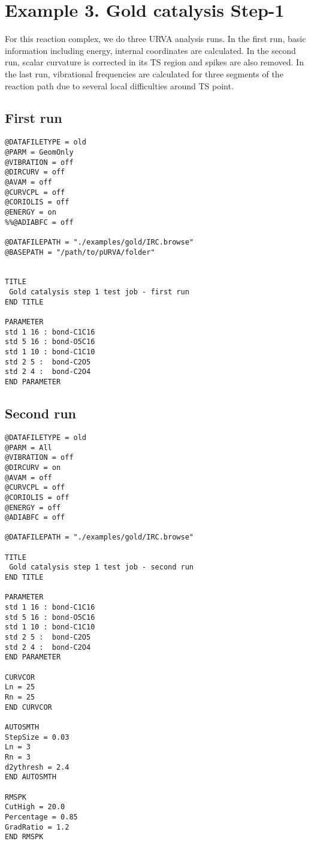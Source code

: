 \section{Example 3. Gold catalysis Step-1}
For this reaction complex, we do three URVA analysis runs. In the first run, basic information including energy, internal coordinates are calculated. In the second run, scalar curvature is corrected in its TS region and spikes are also removed. In the last run, vibrational frequencies are calculated for three segments of the reaction path due to several local difficulties around TS point.




\subsection{First run}

\begin{tcolorbox}

\begingroup\singlespacing
\begin{verbatim}
@DATAFILETYPE = old   
@PARM = GeomOnly 
@VIBRATION = off
@DIRCURV = off  
@AVAM = off  
@CURVCPL = off  
@CORIOLIS = off  
@ENERGY = on
%%@ADIABFC = off

@DATAFILEPATH = "./examples/gold/IRC.browse"
@BASEPATH = "/path/to/pURVA/folder"


TITLE
 Gold catalysis step 1 test job - first run
END TITLE

PARAMETER
std 1 16 : bond-C1C16
std 5 16 : bond-O5C16
std 1 10 : bond-C1C10
std 2 5 :  bond-C2O5
std 2 4 :  bond-C2O4
END PARAMETER

\end{verbatim}
\endgroup

\end{tcolorbox}


\subsection{Second run}

\begin{tcolorbox}

\begingroup\singlespacing
\begin{verbatim}
@DATAFILETYPE = old   
@PARM = All 
@VIBRATION = off
@DIRCURV = on
@AVAM = off  
@CURVCPL = off  
@CORIOLIS = off  
@ENERGY = off
@ADIABFC = off

@DATAFILEPATH = "./examples/gold/IRC.browse"

TITLE
 Gold catalysis step 1 test job - second run
END TITLE

PARAMETER
std 1 16 : bond-C1C16
std 5 16 : bond-O5C16
std 1 10 : bond-C1C10
std 2 5 :  bond-C2O5
std 2 4 :  bond-C2O4
END PARAMETER

CURVCOR
Ln = 25
Rn = 25
END CURVCOR

AUTOSMTH
StepSize = 0.03
Ln = 3
Rn = 3
d2ythresh = 2.4
END AUTOSMTH

RMSPK
CutHigh = 20.0
Percentage = 0.85
GradRatio = 1.2
END RMSPK

\end{verbatim}
\endgroup

\end{tcolorbox}




